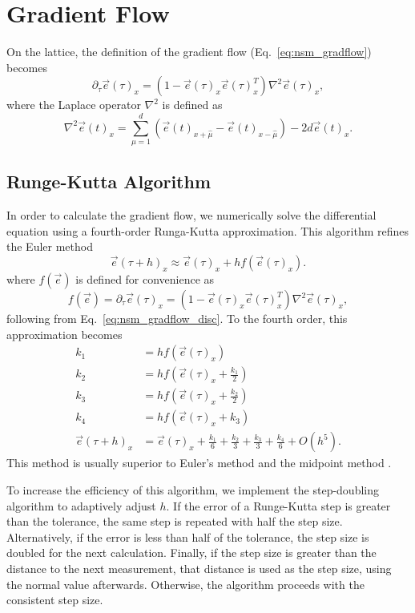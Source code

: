 \documentclass[12pt]{report}
\newcommand{\e}{\vec e}
\begin{document}
\section{Gradient Flow}
\label{sec:gradflow_disc}
On the lattice, the definition of the gradient flow (Eq.~\ref{eq:nsm_gradflow}) becomes 
\begin{equation}
    \label{eq:nsm_gradflow_disc}
    \partial_\tau \e (\tau)_x = \left( 1 - \e(\tau)_x \e(\tau)_x^T\right) \nabla^2 \e(\tau)_x,
\end{equation}
 where the Laplace operator $\nabla^2$ is defined as
\begin{equation*}
    \nabla^2 \e(t)_x = \sum^d_{\mu=1} \left( \e(t)_{x+\hat \mu} - \e(t)_{x-\hat \mu}\right) - 2 d \e(t)_x.
\end{equation*}

\subsection{Runge-Kutta Algorithm}
In order to calculate the gradient flow, we numerically solve the differential equation using a fourth-order Runga-Kutta approximation. This algorithm refines the Euler method 
\begin{equation*}
    \e(\tau+h)_x \approx \e(\tau)_x + h f(\e(\tau)_x).
\end{equation*}
where $f(\e)$ is defined for convenience as 
\begin{equation}
    f(\e)=\partial_\tau \e (\tau)_x  = \left( 1 - \e(\tau)_x \e(\tau)_x^T\right) \nabla^2 \e(\tau)_x,
\end{equation}
following from Eq.~\ref{eq:nsm_gradflow_disc}. To the fourth order, this approximation becomes 
%
\begin{align}
    \label{eq:rungekutta}
    k_1 &= h f(\e(\tau)_x) \\ 
    k_2 &= h f(\e(\tau)_x + \frac{k_1}{2}) \\ 
    k_3 &= h f(\e(\tau)_x + \frac{k_2}{2}) \\ 
    k_4 &= h f(\e(\tau)_x + k_3) \\ 
    \e(\tau+h)_x &= \e(\tau)_x + \frac{k_1}{6} + \frac{k_2}{3} + \frac{k_3}{3} + \frac{k_4}{6} + O(h^5).
\end{align}
This method is usually superior to Euler's method and the midpoint method \cite{vetterling1992}.

To increase the efficiency of this algorithm, we implement the step-doubling algorithm to adaptively adjust $h$. If the error of a Runge-Kutta step is greater than the tolerance, the same step is repeated with half the step size. Alternatively, if the error is less than half of the tolerance, the step size is doubled for the next calculation. Finally, if the step size is greater than the distance to the next measurement, that distance is used as the step size, using the normal value afterwards. Otherwise, the algorithm proceeds with the consistent step size. 
\end{document}

